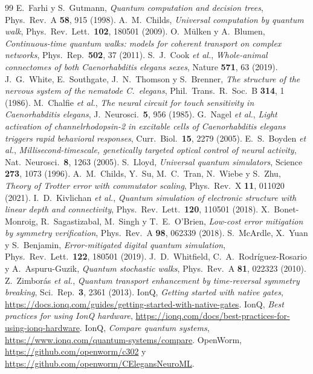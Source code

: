 \documentclass[11pt,a4paper]{article}
\theoremstyle{plain}
\theoremstyle{definition}
\theoremstyle{remark}
\begin{document}
\begin{thebibliography}{99}
 E.~Farhi y S.~Gutmann, \emph{Quantum computation and decision trees}, Phys.\ Rev.\ A \textbf{58}, 915 (1998).
 A.~M.~Childs, \emph{Universal computation by quantum walk}, Phys.\ Rev.\ Lett.\ \textbf{102}, 180501 (2009).
 O.~Mülken y A.~Blumen, \emph{Continuous-time quantum walks: models for coherent transport on complex networks}, Phys.\ Rep.\ \textbf{502}, 37 (2011).
 S.~J.~Cook \emph{et al.}, \emph{Whole-animal connectomes of both Caenorhabditis elegans sexes}, Nature \textbf{571}, 63 (2019).
 J.~G.~White, E.~Southgate, J.~N.~Thomson y S.~Brenner, \emph{The structure of the nervous system of the nematode C.~elegans}, Phil.\ Trans.\ R.\ Soc.\ B \textbf{314}, 1 (1986).
 M.~Chalfie \emph{et al.}, \emph{The neural circuit for touch sensitivity in Caenorhabditis elegans}, J.\ Neurosci.\ \textbf{5}, 956 (1985).
 G.~Nagel \emph{et al.}, \emph{Light activation of channelrhodopsin-2 in excitable cells of Caenorhabditis elegans triggers rapid behavioral responses}, Curr.\ Biol.\ \textbf{15}, 2279 (2005).
 E.~S.~Boyden \emph{et al.}, \emph{Millisecond-timescale, genetically targeted optical control of neural activity}, Nat.\ Neurosci.\ \textbf{8}, 1263 (2005).
 S.~Lloyd, \emph{Universal quantum simulators}, Science \textbf{273}, 1073 (1996).
 A.~M.~Childs, Y.~Su, M.~C.~Tran, N.~Wiebe y S.~Zhu, \emph{Theory of Trotter error with commutator scaling}, Phys.\ Rev.\ X \textbf{11}, 011020 (2021).
 I.~D.~Kivlichan \emph{et al.}, \emph{Quantum simulation of electronic structure with linear depth and connectivity}, Phys.\ Rev.\ Lett.\ \textbf{120}, 110501 (2018).
 X.~Bonet-Monroig, R.~Sagastizabal, M.~Singh y T.~E.~O'Brien, \emph{Low-cost error mitigation by symmetry verification}, Phys.\ Rev.\ A \textbf{98}, 062339 (2018).
 S.~McArdle, X.~Yuan y S.~Benjamin, \emph{Error-mitigated digital quantum simulation}, Phys.\ Rev.\ Lett.\ \textbf{122}, 180501 (2019).
 J.~D.~Whitfield, C.~A.~Rodríguez-Rosario y A.~Aspuru-Guzik, \emph{Quantum stochastic walks}, Phys.\ Rev.\ A \textbf{81}, 022323 (2010).
 Z.~Zimborás \emph{et al.}, \emph{Quantum transport enhancement by time-reversal symmetry breaking}, Sci.\ Rep.\ \textbf{3}, 2361 (2013).
 IonQ, \emph{Getting started with native gates}, \url{https://docs.ionq.com/guides/getting-started-with-native-gates}.
 IonQ, \emph{Best practices for using IonQ hardware}, \url{https://ionq.com/docs/best-practices-for-using-ionq-hardware}.
 IonQ, \emph{Compare quantum systems}, \url{https://www.ionq.com/quantum-systems/compare}.
 OpenWorm, \url{https://github.com/openworm/c302} y \url{https://github.com/openworm/CElegansNeuroML}.
\end{thebibliography}
\end{document}
